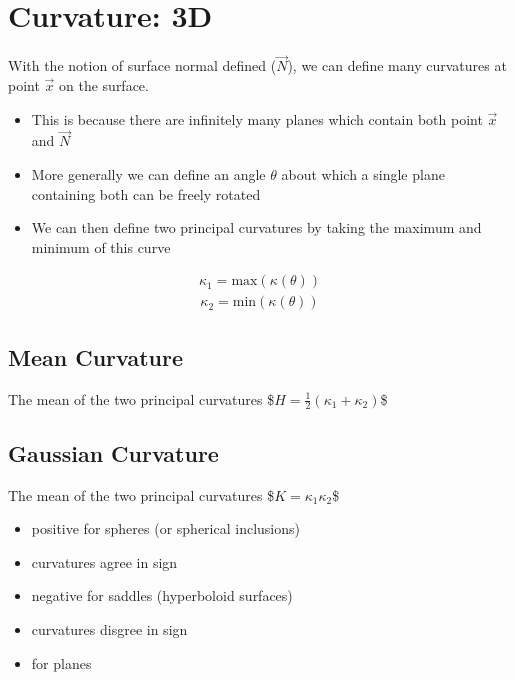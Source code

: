 \documentclass[letterpaper,10pt,english]{sphinxmanual}
\begin{document}
\section{Curvature: 3D}
\label{\detokenize{06-AdvancedShapeAndTexture:curvature-3d}}
\sphinxAtStartPar
With the notion of surface normal defined (\(\vec{N}\)), we can define many curvatures at point \(\vec{x}\) on the surface.
\begin{itemize}
\item {} 
\sphinxAtStartPar
This is because there are infinitely many planes which contain both point \(\vec{x}\) and \(\vec{N}\)

\item {} 
\sphinxAtStartPar
More generally we can define an angle \(\theta\) about which a single plane containing both can be freely rotated

\item {} 
\sphinxAtStartPar
We can then define two principal curvatures by taking the maximum and minimum of this curve

\end{itemize}
\begin{equation*}
\begin{split} \kappa_1 = \textrm{max}(\kappa(\theta)) \end{split}
\end{equation*}\begin{equation*}
\begin{split} \kappa_2 = \textrm{min}(\kappa(\theta)) \end{split}
\end{equation*}

\subsection{Mean Curvature}
\label{\detokenize{06-AdvancedShapeAndTexture:mean-curvature}}
\sphinxAtStartPar
The mean of the two principal curvatures
\$\( H = \frac{1}{2}(\kappa_1+\kappa_2) \)\$


\subsection{Gaussian Curvature}
\label{\detokenize{06-AdvancedShapeAndTexture:gaussian-curvature}}
\sphinxAtStartPar
The mean of the two principal curvatures
\$\( K = \kappa_1\kappa_2 \)\$
\begin{itemize}
\item {} 
\sphinxAtStartPar
positive for spheres (or spherical inclusions)

\item {} 
\sphinxAtStartPar
curvatures agree in sign

\item {} 
\sphinxAtStartPar
negative for saddles (hyperboloid surfaces)

\item {} 
\sphinxAtStartPar
curvatures disgree in sign

\item {} 
 for planes

\end{itemize}
\end{document}
